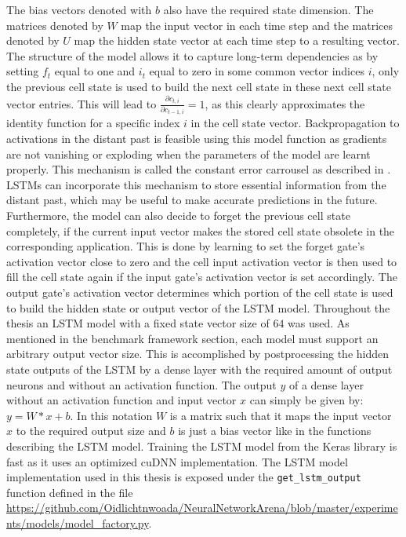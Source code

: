 \documentclass[draft,final]{vutinfth} %
\begin{document}
    The bias vectors denoted with $b$ also have the required state dimension.
    The matrices denoted by $W$ map the input vector in each time step and the matrices denoted by $U$ map the hidden state vector at each time step to a resulting vector.
    The structure of the model allows it to capture long-term dependencies as by setting $f_t$ equal to one and $i_t$ equal to zero in some common vector indices $i$, only the previous cell state is used to build the next cell state in these next cell state vector entries.
    This will lead to $\frac{\partial{c_{t,i}}}{\partial{c_{t-1,i}}} = 1$, as this clearly approximates the identity function for a specific index $i$ in the cell state vector.
    Backpropagation to activations in the distant past is feasible using this model function as gradients are not vanishing or exploding when the parameters of the model are learnt properly.
    This mechanism is called the constant error carrousel as described in \cite[p. 7]{LSTM}.
    LSTMs can incorporate this mechanism to store essential information from the distant past, which may be useful to make accurate predictions in the future.
    Furthermore, the model can also decide to forget the previous cell state completely, if the current input vector makes the stored cell state obsolete in the corresponding application.
    This is done by learning to set the forget gate's activation vector close to zero and the cell input activation vector is then used to fill the cell state again if the input gate's activation vector is set accordingly.
    The output gate's activation vector determines which portion of the cell state is used to build the hidden state or output vector of the LSTM model. 
    Throughout the thesis an LSTM model with a fixed state vector size of $64$ was used. As mentioned in the benchmark framework section, each model must support an arbitrary output vector size.
    This is accomplished by postprocessing the hidden state outputs of the LSTM by a dense layer with the required amount of output neurons and without an activation function.
    The output $y$ of a dense layer without an activation function and input vector $x$ can simply be given by: $y = W*x + b$.
    In this notation $W$ is a matrix such that it maps the input vector $x$ to the required output size and $b$ is just a bias vector like in the functions describing the LSTM model.
    Training the LSTM model from the Keras library is fast as it uses an optimized cuDNN \cite{cuDNN} implementation.
    The LSTM model implementation used in this thesis is exposed under the \texttt{get\_lstm\_output} function defined in the file \url{https://github.com/Oidlichtnwoada/NeuralNetworkArena/blob/master/experiments/models/model_factory.py}.
\end{document}
